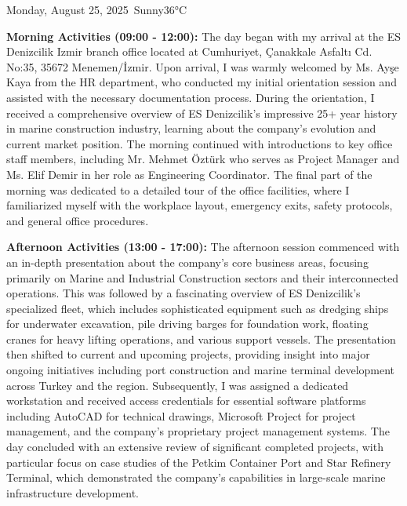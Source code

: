 \begin{dailyentry}{Monday, August 25, 2025}{\weathersunny\ Sunny}{36°C}

\begin{workcontent}
\textbf{Morning Activities (09:00 - 12:00):} The day began with my arrival at the ES Denizcilik Izmir branch office located at Cumhuriyet, Çanakkale Asfaltı Cd. No:35, 35672 Menemen/İzmir. Upon arrival, I was warmly welcomed by Ms. Ayşe Kaya from the HR department, who conducted my initial orientation session and assisted with the necessary documentation process. During the orientation, I received a comprehensive overview of ES Denizcilik's impressive 25+ year history in marine construction industry, learning about the company's evolution and current market position. The morning continued with introductions to key office staff members, including Mr. Mehmet Öztürk who serves as Project Manager and Ms. Elif Demir in her role as Engineering Coordinator. The final part of the morning was dedicated to a detailed tour of the office facilities, where I familiarized myself with the workplace layout, emergency exits, safety protocols, and general office procedures.

\textbf{Afternoon Activities (13:00 - 17:00):} The afternoon session commenced with an in-depth presentation about the company's core business areas, focusing primarily on Marine and Industrial Construction sectors and their interconnected operations. This was followed by a fascinating overview of ES Denizcilik's specialized fleet, which includes sophisticated equipment such as dredging ships for underwater excavation, pile driving barges for foundation work, floating cranes for heavy lifting operations, and various support vessels. The presentation then shifted to current and upcoming projects, providing insight into major ongoing initiatives including port construction and marine terminal development across Turkey and the region. Subsequently, I was assigned a dedicated workstation and received access credentials for essential software platforms including AutoCAD for technical drawings, Microsoft Project for project management, and the company's proprietary project management systems. The day concluded with an extensive review of significant completed projects, with particular focus on case studies of the Petkim Container Port and Star Refinery Terminal, which demonstrated the company's capabilities in large-scale marine infrastructure development.


\end{workcontent}
\end{dailyentry}
